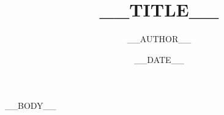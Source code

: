 \documentclass[11pt]{article}
\title{__TITLE__}
\author{__AUTHOR__}
\date{__DATE__}
\begin{document}
\maketitle
\tableofcontents

__BODY__
\end{document}

